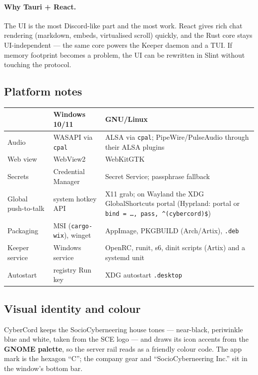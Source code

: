 \documentclass[11pt,a4paper]{article}
\begin{document}
\paragraph{Why Tauri + React.} The UI is the most Discord-like part and the most work.
React gives rich chat rendering (markdown, embeds, virtualised scroll) quickly, and the
Rust core stays UI-independent --- the same core powers the Keeper daemon and a TUI.
If memory footprint becomes a problem, the UI can be rewritten in Slint without touching
the protocol.

\subsection{Platform notes}
\begin{center}
\small
\begin{tabularx}{\linewidth}{@{}l Y Y@{}}
\toprule
 & \textbf{Windows 10/11} & \textbf{GNU/Linux} \\
\midrule
Audio & WASAPI via \texttt{cpal} & ALSA via \texttt{cpal}; PipeWire/PulseAudio through their ALSA plugins \\
Web view & WebView2 & WebKitGTK \\
Secrets & Credential Manager & Secret Service; passphrase fallback \\
Global push-to-talk & system hotkey API & X11 grab; on Wayland the XDG GlobalShortcuts portal (Hyprland: portal or \texttt{bind = \dots, pass, \textasciicircum(cybercord)\$}) \\
Packaging & MSI (\texttt{cargo-wix}), winget & AppImage, PKGBUILD (Arch/Artix), \texttt{.deb} \\
Keeper service & Windows service & OpenRC, runit, s6, dinit scripts (Artix) and a systemd unit \\
Autostart & registry Run key & XDG autostart \texttt{.desktop} \\
\bottomrule
\end{tabularx}
\end{center}

\subsection{Visual identity and colour}

CyberCord keeps the SocioCyberneering house tones --- near-black, periwinkle blue and
white, taken from the SCE logo --- and draws its icon accents from the \textbf{GNOME
palette}, so the server rail reads as a friendly colour code. The app mark is the hexagon
``C''; the company gear and ``SocioCyberneering Inc.'' sit in the window's bottom bar.
\end{document}
